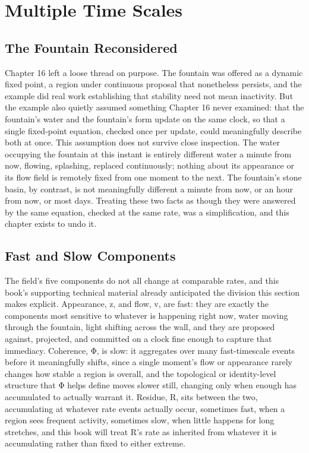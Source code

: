 \chapter{Multiple Time Scales}

\section{The Fountain Reconsidered}

Chapter 16 left a loose thread on purpose. The fountain was offered as a dynamic fixed point, a region under continuous proposal that nonetheless persists, and the example did real work establishing that stability need not mean inactivity. But the example also quietly assumed something Chapter 16 never examined: that the fountain's water and the fountain's form update on the same clock, so that a single fixed-point equation, checked once per update, could meaningfully describe both at once. This assumption does not survive close inspection. The water occupying the fountain at this instant is entirely different water a minute from now, flowing, splashing, replaced continuously; nothing about its appearance or its flow field is remotely fixed from one moment to the next. The fountain's stone basin, by contrast, is not meaningfully different a minute from now, or an hour from now, or most days. Treating these two facts as though they were answered by the same equation, checked at the same rate, was a simplification, and this chapter exists to undo it.

\section{Fast and Slow Components}

The field's five components do not all change at comparable rates, and this book's supporting technical material already anticipated the division this section makes explicit. Appearance, z, and flow, v, are fast: they are exactly the components most sensitive to whatever is happening right now, water moving through the fountain, light shifting across the wall, and they are proposed against, projected, and committed on a clock fine enough to capture that immediacy. Coherence, Φ, is slow: it aggregates over many fast-timescale events before it meaningfully shifts, since a single moment's flow or appearance rarely changes how stable a region is overall, and the topological or identity-level structure that Φ helps define moves slower still, changing only when enough has accumulated to actually warrant it. Residue, R, sits between the two, accumulating at whatever rate events actually occur, sometimes fast, when a region sees frequent activity, sometimes slow, when little happens for long stretches, and this book will treat R's rate as inherited from whatever it is accumulating rather than fixed to either extreme.

